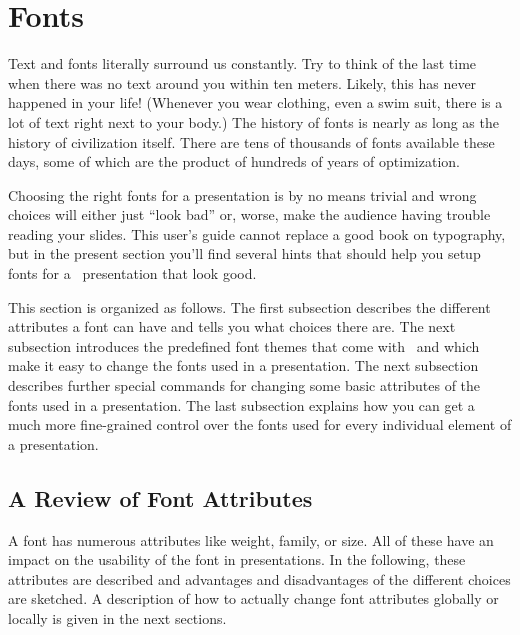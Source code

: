 
%


\section{Fonts}

Text and fonts literally surround us constantly. Try to think of the
last time when  there was no text around you within ten
meters. Likely, this has never happened in your life! 
(Whenever you wear clothing, even a swim suit, there is a lot of text
right next to your body.) The history of fonts is nearly as long as
the history of civilization itself. There are tens of thousands of fonts
available these days, some of which are the product of hundreds of
years of optimization.

Choosing the right fonts for a presentation is by no means
trivial and wrong choices will either just ``look bad'' or, worse,
make the audience having trouble reading your slides.
This user's guide cannot replace a good book on typography, but in the
present section you'll find several hints that should help you setup 
fonts for a \beamer\ presentation that look good.

This section is organized as follows. The first subsection 
describes the different attributes a font can have and tells you what
choices there are. The next subsection introduces the predefined font
themes that come with \beamer\ and which make it easy to change the
fonts used in a presentation. The next subsection describes further
special commands for changing some basic attributes of the fonts used in a
presentation. The last subsection explains how you can get a much more
fine-grained control over the fonts used for every individual element
of a presentation. 



\subsection{A Review of Font Attributes}

A font has numerous attributes like weight, family, or size. All of
these have an impact on the usability of the font in
presentations. In the following, these attributes are described and
advantages and disadvantages of the different choices are sketched.
A description of how to actually change font attributes globally or
locally is given in the next sections.


